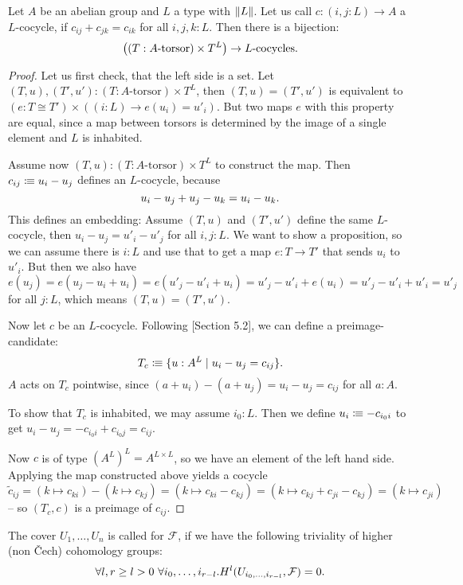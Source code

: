 \begin{lemma}%
  \label{deligne-construction}
  Let $A$ be an abelian group and $L$ a type with $\lVert L \rVert$.
  Let us call $c:(i,j:L)\to A$ a $L$-cocycle, if $c_{ij}+c_{jk}=c_{ik}$ for all $i,j,k:L$.
  Then there is a bijection:
  \[
    \left((T:\text{$A$-torsor})\times T^L\right) \to \text{$L$-cocycles}
    \rlap{.}
  \]
\end{lemma}

\begin{proof}
  Let us first check, that the left side is a set.
  Let $(T,u),(T',u'):(T:\text{$A$-torsor})\times T^L$,
  then $(T,u)=(T',u')$ is equivalent to $(e:T\cong T')\times ((i:L)\to e(u_i)=u'_i)$.
  But two maps $e$ with this property are equal,
  since a map between torsors is determined by the image of a single element and $L$ is inhabited.
  
  Assume now $(T,u):(T:\text{$A$-torsor})\times T^L$ to construct the map.
  Then $c_{ij}\vcentcolon\mspace{-1.2mu}\equiv u_i-u_j$ defines an $L$-cocycle,
  because
  \[
    u_i-u_j + u_j-u_k = u_i-u_k
    \rlap{.}
  \]
  This defines an embedding: Assume $(T,u)$ and $(T',u')$ define the same $L$-cocycle,
  then $u_i-u_j=u'_i-u'_j$ for all $i,j:L$.
  We want to show a proposition, so we can assume there is $i:L$ and use that to get a map $e:T\to T'$
  that sends $u_i$ to $u'_i$.
  But then we also have
  \[
    e(u_j)=e(u_j-u_i+u_i)=e(u'_j-u'_i+u_i)=u'_j-u'_i+e(u_i)=u'_j-u'_i+u'_i=u'_j
  \]
  for all $j:L$, which means $(T,u)=(T',u')$.
    
  Now let $c$ be an $L$-cocycle.
  Following \cite{Deligne91}[Section 5.2], we can define a preimage-candidate:
  \[
    T_c\colonequiv \{u:A^L\mid u_i-u_j=c_{ij}\}
    \rlap{.}
  \]
  $A$ acts on $T_c$ pointwise, since $(a+u_i)-(a+u_j)=u_i-u_j=c_{ij}$ for all $a:A$.
  
  To show that $T_c$ is inhabited,
  we may assume $i_0:L$.
  Then we define $u_i\vcentcolon\mspace{-1.2mu}\equiv -c_{i_0i}$ to get $u_i-u_j=-c_{i_0i}+c_{i_0j}=c_{ij}$.

  Now $c$ is of type $(A^L)^L=A^{L\times L}$, so we have an element of the left hand side.
  Applying the map constructed above yields a cocycle
  \[
    \tilde{c}_{ij}=(k\mapsto c_{ki})-(k\mapsto c_{kj})=(k\mapsto c_{ki}-c_{kj})=(k\mapsto c_{kj}+c_{ji}-c_{kj})=(k\mapsto c_{ji})
  \]
  -- so $(T_c,c)$ is a preimage of $c_{ij}$.
\end{proof}

\begin{definition}
  The cover $U_1,\dots,U_n$ is called  for $\mathcal F$,
  if we have the following triviality of higher (non Čech) cohomology groups:
  \[
    \forall l, r\geq l>0\ \forall i_0,\dots,i_{r-l}. H^l(U_{i_0,\dots,i_{r-l}},\mathcal F)=0\rlap{.}
  \]
\end{definition}

